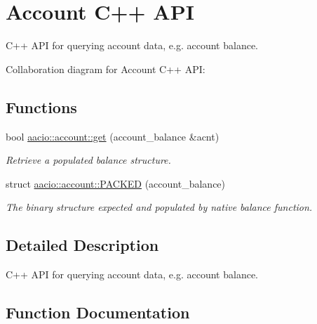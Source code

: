 \hypertarget{group__accountcppapi}{}\section{Account C++ A\+PI}
\label{group__accountcppapi}


C++ A\+PI for querying account data, e.\+g. account balance.  


Collaboration diagram for Account C++ A\+PI\+:
\subsection*{Functions}
\begin{DoxyCompactItemize}
\item 
bool \mbox{\hyperlink{group__accountcppapi_ga1f55ade0cb1bd173ca8eaf88ac60dff9}{aacio\+::account\+::get}} (account\+\_\+balance \&acnt)
\begin{DoxyCompactList}\small\item\em Retrieve a populated balance structure. \end{DoxyCompactList}\end{DoxyCompactItemize}
\begin{DoxyCompactItemize}
\item 
struct \mbox{\hyperlink{group__accountcppapi_ga12342e761e2d66157d0f5dd9494cef06}{aacio\+::account\+::\+P\+A\+C\+K\+ED}} (account\+\_\+balance)
\begin{DoxyCompactList}\small\item\em The binary structure expected and populated by native balance function. \end{DoxyCompactList}\end{DoxyCompactItemize}


\subsection{Detailed Description}
C++ A\+PI for querying account data, e.\+g. account balance. 



\subsection{Function Documentation}
\mbox{\label{group__accountcppapi_ga1f55ade0cb1bd173ca8eaf88ac60dff9}} 
